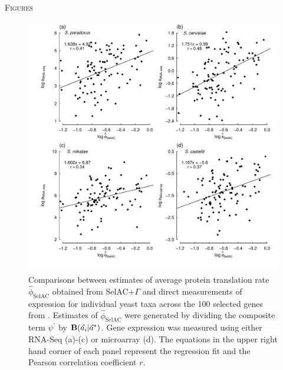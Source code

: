 \documentclass[12pt,letterpaper,fleqn]{article}
\renewcommand{\section}[1]{%
\bigskip
\begin{center}
\begin{Large}
\normalfont\scshape #1
\medskip
\end{Large}
\end{center}}
\newcommand{\Funcaveci}{\ensuremath{\Func(\aveci|\aoptvec)}\xspace}
\newcommand{\Func}{\ensuremath{\text{\textbf{B}}}\xspace}
\newcommand{\selac}{SelAC\xspace}
\newcommand{\selacplusgamma}{SelAC$+\Gamma$\xspace}
\newcommand{\aoptvec}{\ensuremath{\Vec{a}^*}\xspace}
\newcommand{\aveci}{\ensuremath{\Vec{a}_i}\xspace}
\newcommand{\phihat}{\ensuremath{\hat{\phi}_{\text{\selac}}}\xspace}
\newcommand{\psiprime}{\ensuremath{\psi^\prime}\xspace}
\begin{document}
\clearpage %

\section{Figures}

\begin{figure}[H]
  \centering
  \includegraphics[width=0.9\linewidth]{FIGURE_1_SelACwG_vs_Empirical_by_spp.pdf}
  \caption{Comparisons between estimates of average protein translation rate $\phihat$ obtained from \selacplusgamma and direct measurements of expression for individual yeast taxa across the 100 selected genes from \citet{SalichosAndRokas2013}.
        Estimates of $\phihat$ were generated by dividing the composite term $\psiprime$ by \Funcaveci.
        Gene expression was measured using either RNA-Seq (a)-(c) or microarray (d). The equations in the upper right hand corner of each panel represent the regression fit and the Pearson correlation coefficient $r$.
  }
  \label{fig:PhivsEmpirical}
\end{figure}
\end{document}
